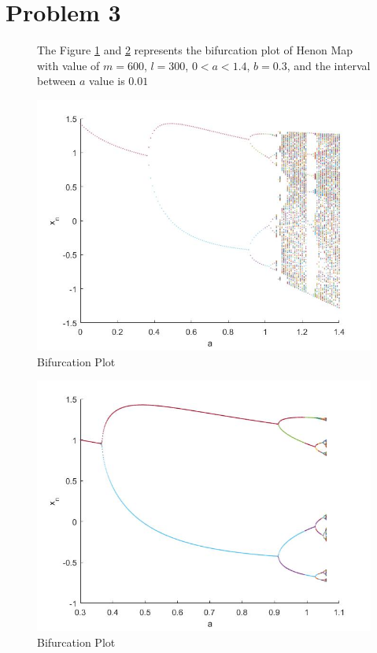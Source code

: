 \documentclass[11pt,a4paper]{article}
\begin{document}
\section*{Problem 3}
\begin{figure}[H]
{
The Figure \ref{fig:prob3} and \ref{fig:prob31} represents the bifurcation plot of Henon Map with value of $m = 600$, $l=300$, $0<a<1.4$, $b=0.3$, and the interval between $a$ value is $0.01$ \par\bigskip
\centering 
\includegraphics[scale=0.3]{images/prob3.jpg}
\caption{Bifurcation Plot}
\label{fig:prob3}
}
\end{figure}
\begin{figure}[H]
{
\centering 
\includegraphics[scale=0.3]{images/prob31.jpg}
\caption{Bifurcation Plot}
\label{fig:prob31}
}
\end{figure}
\end{document}
